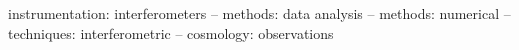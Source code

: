 \documentclass[useAMS,usenatbib]{mn2e}
\begin{document}
\begin{abstract}
\end{abstract}


\begin{keywords}
instrumentation: interferometers -- methods: data analysis -- methods: numerical --techniques: interferometric -- cosmology: observations
\end{keywords}
\end{document}
